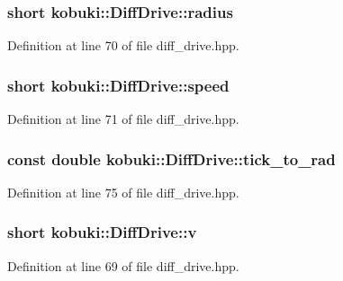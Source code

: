 \subsubsection[{radius}]{\setlength{\rightskip}{0pt plus 5cm}short {\bf kobuki\-::\-Diff\-Drive\-::radius}\hspace{0.3cm}{\ttfamily  [private]}}\label{classkobuki_1_1DiffDrive_ab0859422eaf53fca148a6df9b689ac4f}


\-Definition at line 70 of file diff\-\_\-drive.\-hpp.

\subsubsection[{speed}]{\setlength{\rightskip}{0pt plus 5cm}short {\bf kobuki\-::\-Diff\-Drive\-::speed}\hspace{0.3cm}{\ttfamily  [private]}}\label{classkobuki_1_1DiffDrive_ad46245e29706e8b86722390659e9f540}


\-Definition at line 71 of file diff\-\_\-drive.\-hpp.

\subsubsection[{tick\-\_\-to\-\_\-rad}]{\setlength{\rightskip}{0pt plus 5cm}const double {\bf kobuki\-::\-Diff\-Drive\-::tick\-\_\-to\-\_\-rad}\hspace{0.3cm}{\ttfamily  [private]}}\label{classkobuki_1_1DiffDrive_ac61d00b9dfa7e395e42e8440124c0d46}


\-Definition at line 75 of file diff\-\_\-drive.\-hpp.

\subsubsection[{v}]{\setlength{\rightskip}{0pt plus 5cm}short {\bf kobuki\-::\-Diff\-Drive\-::v}\hspace{0.3cm}{\ttfamily  [private]}}\label{classkobuki_1_1DiffDrive_add2f082180cce0d7e09a69c8d736b2bb}


\-Definition at line 69 of file diff\-\_\-drive.\-hpp.

